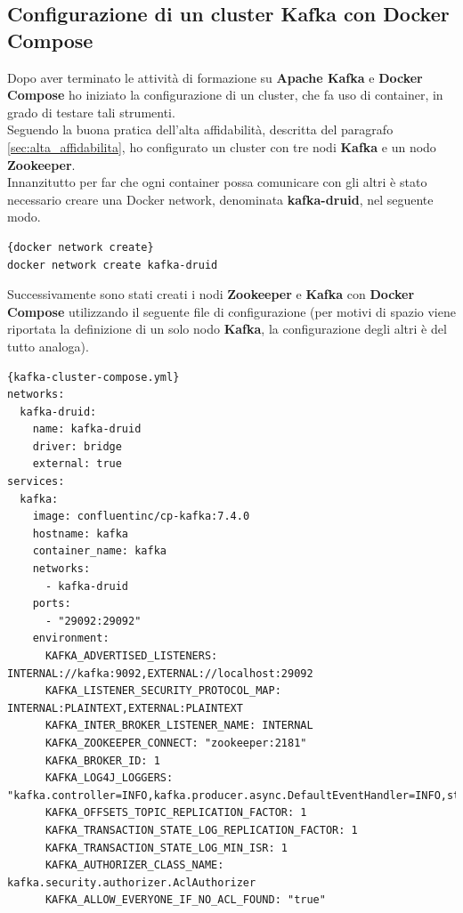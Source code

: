 \subsection{Configurazione di un cluster Kafka con Docker Compose}
Dopo aver terminato le attività di formazione su \textbf{Apache Kafka} e \textbf{Docker Compose} 
ho iniziato la configurazione di un \gls{cluster}{}, che fa uso di \gls{container}{}, in grado di testare tali strumenti.
\\Seguendo la buona pratica dell'alta affidabilità, descritta del 
paragrafo \ref{sec:alta_affidabilita}, ho configurato un \gls{cluster}{} con tre nodi \textbf{Kafka} e un nodo \textbf{Zookeeper}.\\
Innanzitutto per far che ogni \gls{container}{} possa comunicare con gli altri è stato necessario creare una 
\gls{Docker network}{}, denominata \textbf{kafka-druid}, nel seguente modo.
\begin{lstlisting}[caption=\texttt{docker network create}, label=lst:file]{docker network create}
docker network create kafka-druid
\end{lstlisting}
Successivamente sono stati creati i nodi \textbf{Zookeeper} e \textbf{Kafka} con \textbf{Docker Compose} 
utilizzando il seguente file di 
configurazione (per motivi di spazio viene riportata la definizione di un solo nodo \textbf{Kafka}, la configurazione degli altri è del tutto analoga).
\begin{lstlisting}[caption=\texttt{kafka-cluster-compose.yml}, label=lst:file]{kafka-cluster-compose.yml}
networks:
  kafka-druid:
    name: kafka-druid
    driver: bridge
    external: true
services:
  kafka:
    image: confluentinc/cp-kafka:7.4.0
    hostname: kafka
    container_name: kafka
    networks:
      - kafka-druid
    ports:
      - "29092:29092"
    environment:
      KAFKA_ADVERTISED_LISTENERS: INTERNAL://kafka:9092,EXTERNAL://localhost:29092
      KAFKA_LISTENER_SECURITY_PROTOCOL_MAP: INTERNAL:PLAINTEXT,EXTERNAL:PLAINTEXT
      KAFKA_INTER_BROKER_LISTENER_NAME: INTERNAL
      KAFKA_ZOOKEEPER_CONNECT: "zookeeper:2181"
      KAFKA_BROKER_ID: 1
      KAFKA_LOG4J_LOGGERS: "kafka.controller=INFO,kafka.producer.async.DefaultEventHandler=INFO,state.change.logger=INFO"
      KAFKA_OFFSETS_TOPIC_REPLICATION_FACTOR: 1
      KAFKA_TRANSACTION_STATE_LOG_REPLICATION_FACTOR: 1
      KAFKA_TRANSACTION_STATE_LOG_MIN_ISR: 1
      KAFKA_AUTHORIZER_CLASS_NAME: kafka.security.authorizer.AclAuthorizer
      KAFKA_ALLOW_EVERYONE_IF_NO_ACL_FOUND: "true"

\end{lstlisting}
